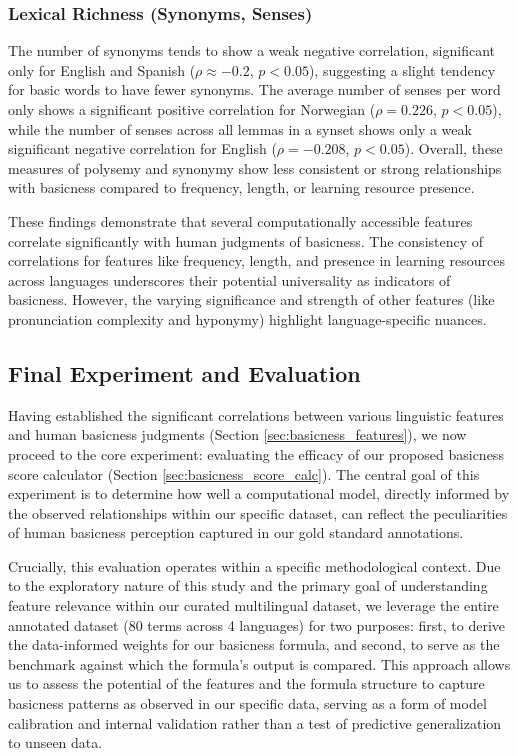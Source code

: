 \documentclass[preprint,12pt,authoryear]{elsarticle}
\begin{document}
\subsubsection{Lexical Richness (Synonyms, Senses)}
The number of synonyms tends to show a weak negative correlation, significant only for English and Spanish ($\rho \approx -0.2$, $p < 0.05$), suggesting a slight tendency for basic words to have fewer synonyms. The average number of senses per word only shows a significant positive correlation for Norwegian ($\rho = 0.226$, $p < 0.05$), while the number of senses across all lemmas in a synset shows only a weak significant negative correlation for English ($\rho = -0.208$, $p < 0.05$). Overall, these measures of polysemy and synonymy show less consistent or strong relationships with basicness compared to frequency, length, or learning resource presence.

These findings demonstrate that several computationally accessible features correlate significantly with human judgments of basicness. The consistency of correlations for features like frequency, length, and presence in learning resources across languages underscores their potential universality as indicators of basicness. However, the varying significance and strength of other features (like pronunciation complexity and hyponymy) highlight language-specific nuances.

\subsection{Final Experiment and Evaluation}

Having established the significant correlations between various linguistic features and human basicness judgments (Section \ref{sec:basicness_features}), we now proceed to the core experiment: evaluating the efficacy of our proposed basicness score calculator (Section \ref{sec:basicness_score_calc}). The central goal of this experiment is to determine how well a computational model, directly informed by the observed relationships within our specific dataset, can reflect the peculiarities of human basicness perception captured in our gold standard annotations.

Crucially, this evaluation operates within a specific methodological context. Due to the exploratory nature of this study and the primary goal of understanding feature relevance within our curated multilingual dataset, we leverage the entire annotated dataset (80 terms across 4 languages) for two purposes: first, to derive the data-informed weights for our basicness formula, and second, to serve as the benchmark against which the formula's output is compared. This approach allows us to assess the potential of the features and the formula structure to capture basicness patterns as observed in our specific data, serving as a form of model calibration and internal validation rather than a test of predictive generalization to unseen data.
\end{document}
